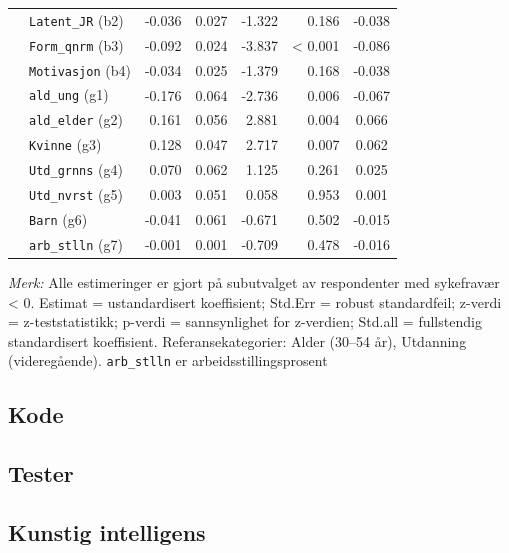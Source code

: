 \documentclass[
  12pt,
  a4paper,
  DIV=11,
  numbers=noendperiod]{scrartcl}
\begin{document}
\begin{table}[htbp]
\begin{tabular}{@{}llrrrrc@{}}
& \texttt{Latent\_JR} (b2)        & -0.036& 0.027 & -1.322 & 0.186   & -0.038 \\
& \texttt{Form\_qnrm} (b3)        & -0.092& 0.024 & -3.837 & < 0.001 & -0.086 \\
& \texttt{Motivasjon} (b4)        & -0.034& 0.025 & -1.379 & 0.168   & -0.038 \\
& \texttt{ald\_ung} (g1)          & -0.176& 0.064 & -2.736 & 0.006   & -0.067 \\
& \texttt{ald\_elder} (g2)        & 0.161 & 0.056 & 2.881  & 0.004   & 0.066 \\
& \texttt{Kvinne} (g3)            & 0.128 & 0.047 & 2.717  & 0.007   & 0.062 \\
& \texttt{Utd\_grnns} (g4)        & 0.070 & 0.062 & 1.125  & 0.261   & 0.025 \\
& \texttt{Utd\_nvrst} (g5)        & 0.003 & 0.051 & 0.058  & 0.953   & 0.001 \\
& \texttt{Barn} (g6)              & -0.041& 0.061 & -0.671 & 0.502   & -0.015 \\
& \texttt{arb\_stlln} (g7)        & -0.001& 0.001 & -0.709 & 0.478   & -0.016 \\
\bottomrule
\end{tabular}
\footnotesize{%
\textit{Merk:} Alle estimeringer er gjort på subutvalget av respondenter med sykefravær < 0. Estimat = ustandardisert koeffisient; Std.Err = robust standardfeil; z-verdi = z-teststatistikk; p-verdi = sannsynlighet for z-verdien; Std.all = fullstendig standardisert koeffisient. Referansekategorier: Alder (30–54 år), Utdanning (videregående). \texttt{arb\_stlln} er arbeidsstillingsprosent}
\end{table}

\subsection*{Kode}\label{kode}

\subsection*{Tester}\label{tester}

\subsection*{Kunstig intelligens}\label{kunstig-intelligens}
\end{document}
